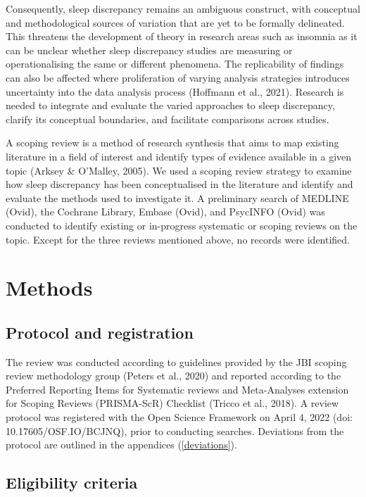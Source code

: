 \documentclass[
]{article}
\begin{document}
Consequently, sleep discrepancy remains an ambiguous construct, with conceptual and methodological sources of variation that are yet to be formally delineated. This threatens the development of theory in research areas such as insomnia as it can be unclear whether sleep discrepancy studies are measuring or operationalising the same or different phenomena. The replicability of findings can also be affected where proliferation of varying analysis strategies introduces uncertainty into the data analysis process (Hoffmann et al., 2021). Research is needed to integrate and evaluate the varied approaches to sleep discrepancy, clarify its conceptual boundaries, and facilitate comparisons across studies.

A scoping review is a method of research synthesis that aims to map existing literature in a field of interest and identify types of evidence available in a given topic (Arksey \& O'Malley, 2005). We used a scoping review strategy to examine how sleep discrepancy has been conceptualised in the literature and identify and evaluate the methods used to investigate it. A preliminary search of MEDLINE (Ovid), the Cochrane Library, Embase (Ovid), and PsycINFO (Ovid) was conducted to identify existing or in-progress systematic or scoping reviews on the topic. Except for the three reviews mentioned above, no records were identified.

\section{Methods}\label{methods}

\subsection{Protocol and registration}\label{protocol}

The review was conducted according to guidelines provided by the JBI scoping review methodology group (Peters et al., 2020) and reported according to the Preferred Reporting Items for Systematic reviews and Meta-Analyses extension for Scoping Reviews (PRISMA-ScR) Checklist (Tricco et al., 2018). A review protocol was registered with the Open Science Framework on April 4, 2022 (doi: 10.17605/OSF.IO/BCJNQ), prior to conducting searches. Deviations from the protocol are outlined in the appendices (\ref{deviations}).

\subsection{Eligibility criteria}\label{item6}
\end{document}
